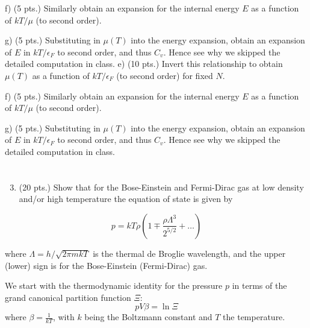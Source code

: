 \documentclass[12pt]{article}
\begin{document}
f) (5 pts.) Similarly obtain an expansion for the internal energy $E$ as a function of $k T / \mu$ (to second order).

g) (5 pts.) Substituting in $\mu(T)$ into the energy expansion, obtain an expansion of $E$ in $k T / \epsilon_{F}$ to second order, and thus $C_{v}$. Hence see why we skipped the detailed computation in class.
e) (10 pts.) Invert this relationship to obtain $\mu(T)$ as a function of $k T / \epsilon_{F}$ (to second order) for fixed $N$.

f) (5 pts.) Similarly obtain an expansion for the internal energy $E$ as a function of $k T / \mu$ (to second order).

g) (5 pts.) Substituting in $\mu(T)$ into the energy expansion, obtain an expansion of $E$ in $k T / \epsilon_{F}$ to second order, and thus $C_{v}$. Hence see why we skipped the detailed computation in class.
\section{}
\begin{enumerate}
  \setcounter{enumi}{2}
  \item (20 pts.) Show that for the Bose-Einstein and Fermi-Dirac gas at low density and/or high temperature the equation of state is given by
\end{enumerate}

$$
p=k T \rho\left(1 \mp \frac{\rho \Lambda^{3}}{2^{5 / 2}}+\ldots\right)
$$

where $\Lambda=h / \sqrt{2 \pi m k T}$ is the thermal de Broglie wavelength, and the upper (lower) sign is for the Bose-Einstein (Fermi-Dirac) gas.

We start with the thermodynamic identity for the pressure $p$ in terms of the grand canonical partition function $\Xi$:
\begin{equation}
    pV\beta = \ln \Xi
\end{equation}
where $\beta = \frac{1}{kT}$, with $k$ being the Boltzmann constant and $T$ the temperature.
\end{document}
